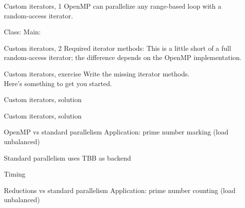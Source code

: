 \documentclass[11pt,headernav]{beamer}
\begin{document}
\begin{numberedframe}{Custom iterators, 1}
  OpenMP can parallelize any range-based loop with a random-access iterator.
  \begin{multicols}{2}
    Class:
    \columnbreak
    Main:
  \end{multicols}
\end{numberedframe}

\begin{numberedframe}{Custom iterators, 2}
  Required iterator methods:
  This is a little short of a full random-access iterator;
  the difference depends on the OpenMP implementation.
\end{numberedframe}

\begin{numberedframe}{Custom iterators, exercise}
  Write the missing iterator methods.\\
  Here's something to get you started.
\end{numberedframe}

\begin{numberedframe}{Custom iterators, solution}
\end{numberedframe}

\begin{numberedframe}{Custom iterators, solution}
\end{numberedframe}

\begin{numberedframe}{OpenMP vs standard parallelism}
  Application: prime number marking
  (load unbalanced)


  Standard parallelism uses \ac{TBB} as backend
\end{numberedframe}

\begin{numberedframe}{Timing}
  
\end{numberedframe}

\begin{numberedframe}{Reductions vs standard parallelism}
  Application: prime number counting
  (load unbalanced)


\end{numberedframe}
\end{document}
